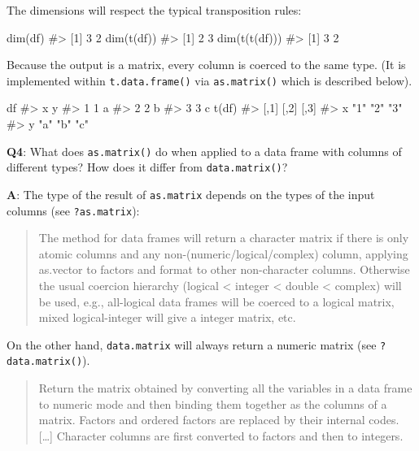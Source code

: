 \documentclass[
]{krantz}
\makeatletter
\newenvironment{Shaded}{\begin{snugshade}}{\end{snugshade}}
\newcommand{\CommentTok}[1]{\textcolor[rgb]{0.56,0.35,0.01}{\textit{#1}}}
\newcommand{\KeywordTok}[1]{\textcolor[rgb]{0.13,0.29,0.53}{\textbf{#1}}}
\newcommand{\NormalTok}[1]{#1}
\newenvironment{kframe}{%
\medskip{}
\setlength{\fboxsep}{.8em}
 \def\at@end@of@kframe{}%
 \ifinner\ifhmode%
  \def\at@end@of@kframe{\end{minipage}}%
  \begin{minipage}{\columnwidth}%
 \fi\fi%
 \def\FrameCommand##1{\hskip\@totalleftmargin \hskip-\fboxsep
 \colorbox{shadecolor}{##1}\hskip-\fboxsep
     \hskip-\linewidth \hskip-\@totalleftmargin \hskip\columnwidth}%
 \MakeFramed {\advance\hsize-\width
   \@totalleftmargin\z@ \linewidth\hsize
   \@setminipage}}%
 {\par\unskip\endMakeFramed%
 \at@end@of@kframe}
\renewenvironment{Shaded}{\begin{kframe}}{\end{kframe}}
\renewcommand{\KeywordTok} [1]{\textcolor[rgb]{0.00,0.44,0.13}{{#1}}}
\renewcommand{\CommentTok} [1]{\textcolor[rgb]{0.38,0.63,0.69}{{#1}}}
\renewcommand{\NormalTok}  [1]{{#1}}
\makeatother
\begin{document}
The dimensions will respect the typical transposition rules:

\begin{Shaded}
\begin{Highlighting}[]
\KeywordTok{dim}\NormalTok{(df)}
\CommentTok{#> [1] 3 2}
\KeywordTok{dim}\NormalTok{(}\KeywordTok{t}\NormalTok{(df))}
\CommentTok{#> [1] 2 3}
\KeywordTok{dim}\NormalTok{(}\KeywordTok{t}\NormalTok{(}\KeywordTok{t}\NormalTok{(df)))}
\CommentTok{#> [1] 3 2}
\end{Highlighting}
\end{Shaded}

Because the output is a matrix, every column is coerced to the same type. (It is implemented within \texttt{t.data.frame()} via \texttt{as.matrix()} which is described below).

\begin{Shaded}
\begin{Highlighting}[]
\NormalTok{df}
\CommentTok{#>   x y}
\CommentTok{#> 1 1 a}
\CommentTok{#> 2 2 b}
\CommentTok{#> 3 3 c}
\KeywordTok{t}\NormalTok{(df)}
\CommentTok{#>   [,1] [,2] [,3]}
\CommentTok{#> x "1"  "2"  "3" }
\CommentTok{#> y "a"  "b"  "c"}
\end{Highlighting}
\end{Shaded}

\textbf{{Q4}}: What does \texttt{as.matrix()} do when applied to a data frame with columns of different types? How does it differ from \texttt{data.matrix()}?

\textbf{{A}}: The type of the result of \texttt{as.matrix} depends on the types of the input columns (see \texttt{?as.matrix}):

\begin{quote}
The method for data frames will return a character matrix if there is only atomic columns and any non-(numeric/logical/complex) column, applying as.vector to factors and format to other non-character columns. Otherwise the usual coercion hierarchy (logical \textless{} integer \textless{} double \textless{} complex) will be used, e.g., all-logical data frames will be coerced to a logical matrix, mixed logical-integer will give a integer matrix, etc.
\end{quote}

On the other hand, \texttt{data.matrix} will always return a numeric matrix (see \texttt{?data.matrix()}).

\begin{quote}
Return the matrix obtained by converting all the variables in a data frame to numeric mode and then binding them together as the columns of a matrix. Factors and ordered factors are replaced by their internal codes. {[}\ldots{]} Character columns are first converted to factors and then to integers.
\end{quote}
\end{document}
